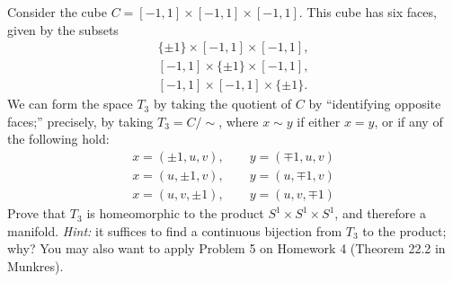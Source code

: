 \documentclass[12pt, letterpaper]{article}
\begin{document}
\begin{problem}{}
    Consider the cube $C = [-1,1] \times [-1,1] \times [-1,1]$. This
cube has six faces, given by the subsets
\begin{align*}
\{\pm 1\} \times [-1, 1] \times [-1, 1],\\
[-1, 1] \times \{\pm 1\} \times [-1, 1],\\
[-1, 1] \times [-1, 1] \times \{\pm 1\}.
\end{align*}
We can form the space $T_3$ by taking the quotient of $C$ by
``identifying opposite faces;'' precisely, by taking
$T_3 = C / \sim$, where $x \sim y$ if either $x = y$, or if any of
the following hold:
\begin{align*}
x = (\pm 1, u, v), \qquad y = (\mp 1, u, v)\\
x = (u, \pm 1, v), \qquad y = (u, \mp 1, v)\\
x = (u, v, \pm 1), \qquad y = (u, v, \mp 1)
\end{align*}
Prove that $T_3$ is homeomorphic to the product
$S^1 \times S^1 \times S^1$, and therefore a
manifold. \textit{Hint:} it suffices to find a continuous bijection
from $T_3$ to the product; why? You may also want to apply Problem 5
on Homework 4 (Theorem 22.2 in Munkres).
\end{problem}
\end{document}
